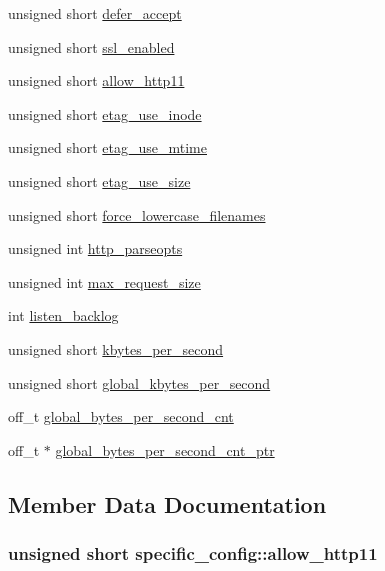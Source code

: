 \begin{DoxyCompactItemize}
\item 
unsigned short \hyperlink{structspecific__config_a0add70e0d4abb5e9ab8148334779071b}{defer\-\_\-accept}
\item 
unsigned short \hyperlink{structspecific__config_a98bb430e5bdbd0eee2eaddb03cbfd1d0}{ssl\-\_\-enabled}
\item 
unsigned short \hyperlink{structspecific__config_aae645796b6a6fa04266b4ad19dcc7891}{allow\-\_\-http11}
\item 
unsigned short \hyperlink{structspecific__config_a44e63f8a28706a74bd8b6c89e52a0158}{etag\-\_\-use\-\_\-inode}
\item 
unsigned short \hyperlink{structspecific__config_ac352c3fe57ceee2ca29dac31539cafb3}{etag\-\_\-use\-\_\-mtime}
\item 
unsigned short \hyperlink{structspecific__config_a098935f5506354a9ac54f05ac0f38cce}{etag\-\_\-use\-\_\-size}
\item 
unsigned short \hyperlink{structspecific__config_ae311c9dd2c11adab7b26b4d9e0a1053c}{force\-\_\-lowercase\-\_\-filenames}
\item 
unsigned int \hyperlink{structspecific__config_a31d4946958587e46d6c5ded03943daf1}{http\-\_\-parseopts}
\item 
unsigned int \hyperlink{structspecific__config_a3e19e97363aad607e729d09aa8e51c16}{max\-\_\-request\-\_\-size}
\item 
int \hyperlink{structspecific__config_ab326b0b3249b5ab1d599baa82742977a}{listen\-\_\-backlog}
\item 
unsigned short \hyperlink{structspecific__config_a35cbf387c2c060b06622093e243c72df}{kbytes\-\_\-per\-\_\-second}
\item 
unsigned short \hyperlink{structspecific__config_ae82d49c4aedfe0855bb20aeb79e62102}{global\-\_\-kbytes\-\_\-per\-\_\-second}
\item 
off\-\_\-t \hyperlink{structspecific__config_a3a575b3037976fdaf1330ed22a01c994}{global\-\_\-bytes\-\_\-per\-\_\-second\-\_\-cnt}
\item 
off\-\_\-t $\ast$ \hyperlink{structspecific__config_a815ceb9b167bbc32dea17269f604d572}{global\-\_\-bytes\-\_\-per\-\_\-second\-\_\-cnt\-\_\-ptr}
\end{DoxyCompactItemize}


\subsection{Member Data Documentation}
\hypertarget{structspecific__config_aae645796b6a6fa04266b4ad19dcc7891}{
\subsubsection[{allow\-\_\-http11}]{\setlength{\rightskip}{0pt plus 5cm}unsigned short specific\-\_\-config\-::allow\-\_\-http11}}\label{structspecific__config_aae645796b6a6fa04266b4ad19dcc7891}



